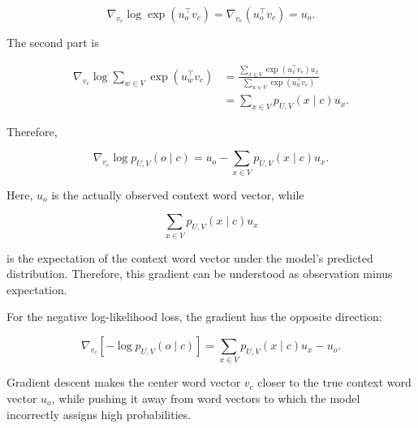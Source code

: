 \documentclass[
  a4paper,
  10pt]{article}
\begin{document}
\[
\nabla_{v_c}\log\exp(u_o^\top v_c)=
\nabla_{v_c}(u_o^\top v_c)=
u_o.
\]

The second part is

\[
\begin{aligned}
\nabla_{v_c}
\log\sum_{w\in V}\exp(u_w^\top v_c)
&=
\frac{
\sum_{x\in V}
\exp(u_x^\top v_c)u_x
}{
\sum_{w\in V}
\exp(u_w^\top v_c)
} \\
&=
\sum_{x\in V}
p_{U,V}(x\mid c)u_x.
\end{aligned}
\]

Therefore,

\[
\nabla_{v_c}\log p_{U,V}(o\mid c)=
u_o-
\sum_{x\in V}
p_{U,V}(x\mid c)u_x.
\]

Here, \(u_o\) is the actually observed context word vector, while

\[
\sum_{x\in V}p_{U,V}(x\mid c)u_x
\]

is the expectation of the context word vector under the model's
predicted distribution. Therefore, this gradient can be understood as
observation minus expectation.

For the negative log-likelihood loss, the gradient has the opposite
direction:

\[
\nabla_{v_c}\left[-\log p_{U,V}(o\mid c)\right]=
\sum_{x\in V}
p_{U,V}(x\mid c)u_x-u_o.
\]

Gradient descent makes the center word vector \(v_c\) closer to the true
context word vector \(u_o\), while pushing it away from word vectors to
which the model incorrectly assigns high probabilities.
\end{document}
